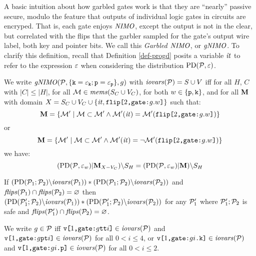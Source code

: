 A basic intuition about how garbled gates work is that they are
``nearly'' passive secure, modulo the feature that outputs of
individual logic gates in circuits are encryped. That is, each gate
enjoys $\mathit{NIMO}$, except the output is not in the clear, but correlated
with the flips that the garbler sampled for the gate's output wire
label, both key and pointer bits. We call this \emph{Garbled $\mathit{NIMO}$},
or $\mathit{gNIMO}$. To clarify this definition, recall that Definition \ref{def-progd}
posits a variable $\mathit{it}$ to refer to the expression $\varepsilon$ when
considering the distribution $\mathrm{PD}(\mathcal{P},\varepsilon)$.
\begin{definition}
  We write $\mathit{gNIMO}(\mathcal{P},\{ \texttt{k} = \varepsilon_{\texttt{k}}; \texttt{p} =
  \varepsilon_{\texttt{p}}\}, g)$ with $\mathit{iovars}(\mathcal{P}) = S \cup V$ iff for all $H$,
  $C$ with $|C| \le |H|$, for all $\mathcal{M} \in \mathit{mems}(S_C \cup V_C)$,
  for both $w \in \{\texttt{p},\texttt{k}\}$, and for all $\mathbf{M}$ with
  domain $X = S_C \cup V_C \cup \{ \mathit{it}, \texttt{flip[}2\texttt{,}\texttt{gate:}g.w\texttt{]} \}$
  such that:
  $$
  \mathbf{M} = \{ \mathcal{M}' \mid \mathcal{M} \subset \mathcal{M}' \wedge 
  \mathcal{M}'(\mathit{it}) = \mathcal{M}'(\texttt{flip[}2\texttt{,}\texttt{gate:}g.w\texttt{]}) \} 
  $$
  or
  $$
  \mathbf{M} = \{ \mathcal{M}' \mid \mathcal{M} \subset \mathcal{M}' \wedge 
  \mathcal{M}'(\mathit{it}) = \neg\mathcal{M}'(\texttt{flip[}2\texttt{,}\texttt{gate:}g.w\texttt{]}) \} 
  $$
  we have:
  $$
  (\mathrm{PD}(\mathcal{P},\varepsilon_w)|\mathbf{M}_{X-{V_C}})\backslash S_H =
  (\mathrm{PD}(\mathcal{P},\varepsilon_w)|\mathbf{M})\backslash S_H
  $$
\end{definition}

\begin{lemma}
  \label{lemma-scope}
  If $(\mathrm{PD}(\mathcal{P}_1;\mathcal{P}_2)\backslash\mathit{iovars}(\mathcal{P}_1)) *
  (\mathrm{PD}(\mathcal{P}_1;\mathcal{P}_2)\backslash\mathit{iovars}(\mathcal{P}_2))$ and
  $\mathit{flips}(\mathcal{P}_1) \cap \mathit{flips}(\mathcal{P}_2) = \varnothing$ then
  $(\mathrm{PD}(\mathcal{P}_1';\mathcal{P}_2)\backslash\mathit{iovars}(\mathcal{P}_1)) *
  (\mathrm{PD}(\mathcal{P}_1';\mathcal{P}_2)\backslash\mathit{iovars}(\mathcal{P}_2))$ for any
  $\mathcal{P}_1'$ where $\mathcal{P}_1';\mathcal{P}_2$ is safe and $\mathit{flips}(\mathcal{P}_1')
  \cap \mathit{flips}(\mathcal{P}_2) = \varnothing$.
\end{lemma}

\begin{definition}
  We write $g \in \mathcal{P}$ iff $\texttt{v[}1\texttt{,}\texttt{gate:}g\texttt{tt}i\texttt{]} \in \mathit{iovars}(\mathcal{P})$
  and $\texttt{v[}1\texttt{,}\texttt{gate:}g\texttt{pt}i\texttt{]} \in \mathit{iovars}(\mathcal{P})$ for all $0 < i \le 4$,
  or  $\texttt{v[}1\texttt{,}\texttt{gate:}gi\texttt{.k}\texttt{]} \in \mathit{iovars}(\mathcal{P})$
  and $\texttt{v[}1\texttt{,}\texttt{gate:}gi\texttt{.p}\texttt{]} \in \mathit{iovars}(\mathcal{P})$ for all $0 < i \le 2$.
\end{definition}

